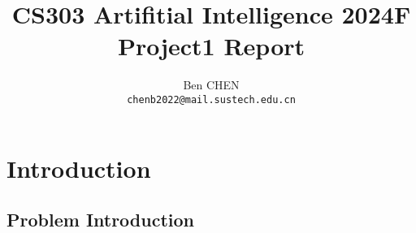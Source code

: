 \documentclass{article}
\title{\textbf{CS303 Artifitial Intelligence 2024F Project1 Report}}
\author{Ben CHEN \\ \texttt{chenb2022@mail.sustech.edu.cn}}
\begin{document}
\maketitle

\section{Introduction}

\subsection{Problem Introduction}
\end{document}
